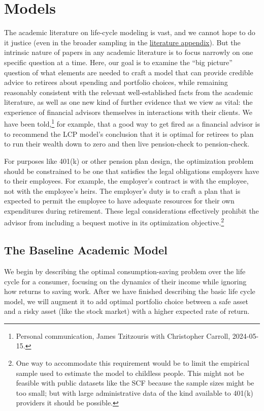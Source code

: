 \documentclass{article}
\begin{document}
\section{Models}\label{models}

The academic literature on life-cycle modeling is vast, and we cannot hope to do it justice (even in the broader sampling in the \href{/lit-review}{literature appendix}).
But the intrinsic nature of papers in any academic literature is to focus narrowly on one specific question at a time.
Here, our goal is to examine the ``big picture'' question of what elements are needed to craft a model that can provide credible advice to retirees about spending and portfolio choices, while remaining reasonably consistent with the relevant well-established facts from the academic literature, as well as one new kind of further evidence that we view as vital: the experience of financial advisors themselves in interactions with their clients.
We have been told,\footnote{Personal communication, James Tzitzouris with Christopher Carroll, 2024-05-15.} for example, that a good way to get fired as a financial advisor is to recommend the LCP model's conclusion that it is optimal for retirees to plan to run their wealth down to zero and then live pension-check to pension-check.

For purposes like 401(k) or other pension plan design, the optimization problem should be constrained to be one that satisfies the legal obligations employers have to their employees.
For example, the employer's contract is with the employee, not with the employee's heirs.
The employer's duty is to craft a plan that is expected to permit the employee to have adequate resources for their own expenditures during retirement.
These legal considerations effectively prohibit the advisor from including a bequest motive in its optimization objective.\footnote{One way to accommodate this requirement would be to limit the empirical sample used to estimate the model to childless people.
This might not be feasible with public datasets like the SCF because the sample sizes might be too small; but with large administrative data of the kind available to 401(k) providers it should be possible.}

\subsection{The Baseline Academic Model}

We begin by describing the optimal consumption-saving problem over the life cycle for a consumer, focusing on the dynamics of their income while ignoring how returns to saving work.
After we have finished describing the basic life cycle model, we will augment it to add optimal portfolio choice between a safe asset and a risky asset (like the stock market) with a higher expected rate of return.
\end{document}
